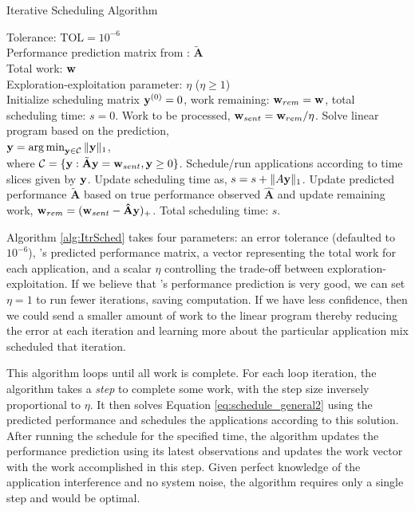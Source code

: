 \begin{algorithm}[!t]
\caption{Iterative Scheduling Algorithm}
\begin{algorithmic}[1]
\small
\REQUIRE Tolerance: $\text{TOL} = 10^{-6}$ \\
Performance prediction matrix from \SYSTEMESP{}: $\tilde{\mathbf{A}}$ \\
Total work: $\mathbf{w}$ \\
Exploration-exploitation parameter: $\eta$ ($\eta \geq 1$)\\
\STATE Initialize scheduling matrix $\mathbf{y}^{(0)} = 0$, work remaining: $ \mathbf{w}_{rem} = \mathbf{w}$, total scheduling time: $s = 0$.
	\STATE Work to be processed, $ \mathbf{w}_{sent} = \mathbf{w}_{rem}/\eta$.
    \STATE Solve linear program based on the prediction, \\ $\mathbf{y} = \operatorname*{arg\,min}_{\mathbf{y} \in \mathcal{C}} \|\mathbf{y}\|_1 $, \\where $ \mathcal{C} = \{ \mathbf{y}: \tilde{\mathbf{A}} \mathbf{y} = \mathbf{w}_{sent} ,\mathbf{y} \geq 0 \}$.
	\STATE Schedule/run applications according to time slices given by $\mathbf{y}$. Update scheduling time as, $s = s + \|A \mathbf{y}\|_1$.
	\STATE Update predicted performance $\mathbf{\tilde{A}}$ based on true performance observed $\mathbf{\hat{A}}$ and update remaining work,  $\mathbf{w}_{rem} = ( \mathbf{w}_{sent} -  \mathbf{\hat{A}} \mathbf{y} )_{+}$.
\ENDWHILE
\RETURN Total scheduling time: $s$.
\end{algorithmic}
\label{alg:ItrSched}
\end{algorithm}

Algorithm \ref{alg:ItrSched} takes four parameters: an error tolerance
(defaulted to $10^{-6}$), \SYSTEM's predicted performance matrix, a
vector representing the total work for each application, and a scalar
$\eta$ controlling the trade-off between exploration-exploitation. If
we believe that \SYSTEMESP{}'s performance prediction is very good, we
can set $\eta = 1$ to run fewer iterations, saving computation. If we
have less confidence, then we could send a smaller amount of work to
the linear program thereby reducing the error at each iteration and
learning more about the particular application mix scheduled that
iteration.

This algorithm loops until all work is complete.  For each loop
iteration, the algorithm takes a \emph{step} to complete some work,
with the step size inversely proportional to $\eta$.  It then solves
Equation \eqref{eq:schedule_general2} using the predicted performance
and schedules the applications according to this solution.  After
running the schedule for the specified time, the algorithm updates the
performance prediction using its latest observations and updates the
work vector with the work accomplished in this step.  Given perfect
knowledge of the application interference and no system noise, the
algorithm requires only a single step and would be optimal.

